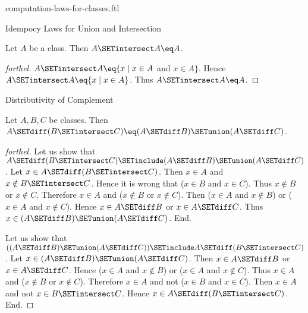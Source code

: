 \documentclass{naproche-library}
\begin{document}
\begin{smodule}[title=Computation Laws For Classes]{computation-laws-for-classes.ftl}
\begin{sfragment}{Idempocy Laws for Union and Intersection}
  \begin{proposition}[forthel,id=FOUNDATIONS_02_4053144145231872]
    Let $A$ be a class.
    Then $A \SETintersect A \eq A$.
  \end{proposition}
  \begin{proof}[forthel]
    $A \SETintersect A \eq \{ x \mid x \in A$ and $x \in A \}$.
    Hence $A \SETintersect A \eq \{ x \mid x \in A \}$.
    Thus $A \SETintersect A \eq A$.
  \end{proof}
\end{sfragment}

\begin{sfragment}{Distributivity of Complement}
  \begin{proposition}[forthel,id=FOUNDATIONS_02_5296031436636160]
    Let $A, B, C$ be classes.
    Then $A \SETdiff (B \SETintersect C) \eq (A \SETdiff B) \SETunion (A \SETdiff C)$.
  \end{proposition}
  \begin{proof}[forthel]
    Let us show that $A \SETdiff (B \SETintersect C) \SETinclude (A \SETdiff B) \SETunion (A \SETdiff C)$.
      Let $x \in A \SETdiff (B \SETintersect C)$.
      Then $x \in A$ and $x \notin B \SETintersect C$.
      Hence it is wrong that ($x \in B$ and $x \in C$).
      Thus $x \notin B$ or $x \notin C$.
      Therefore $x \in A$ and ($x \notin B$ or $x \notin C$).
      Then ($x \in A$ and $x \notin B$) or ($x \in A$ and $x \notin C$).
      Hence $x \in A \SETdiff B$ or $x \in A \SETdiff C$.
      Thus $x \in (A \SETdiff B) \SETunion (A \SETdiff C)$.
    End.

    Let us show that $((A \SETdiff B) \SETunion (A \SETdiff C)) \SETinclude A \SETdiff (B \SETintersect C)$. %
      Let $x \in (A \SETdiff B) \SETunion (A \SETdiff C)$.
      Then $x \in A \SETdiff B$ or $x \in A \SETdiff C$.
      Hence ($x \in A$ and $x \notin B$) or ($x \in A$ and $x \notin C$).
      Thus $x \in A$ and ($x \notin B$ or $x \notin C$).
      Therefore $x \in A$ and not ($x \in B$ and $x \in C$).
      Then $x \in A$ and not $x \in B \SETintersect C$.
      Hence $x \in A \SETdiff (B \SETintersect C)$.
    End.
  \end{proof}


\end{sfragment}
\end{smodule}
\end{document}
